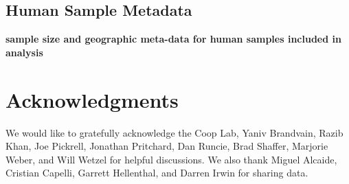 \documentclass[10pt,letterpaper]{article}
\begin{document}
\subsection*{Human Sample Metadata}
\label{globe_data_table}
{\bf{sample size and geographic meta-data for human samples included in analysis}}

\section*{Acknowledgments}
We would like to gratefully acknowledge the Coop Lab, Yaniv Brandvain, Razib Khan, Joe Pickrell, 
Jonathan Pritchard, Dan Runcie, Brad Shaffer, Marjorie Weber, and Will Wetzel for helpful discussions.  
We also thank Miguel Alcaide, Cristian Capelli, Garrett Hellenthal, and Darren Irwin for sharing data.

\nolinenumbers
\end{document}

